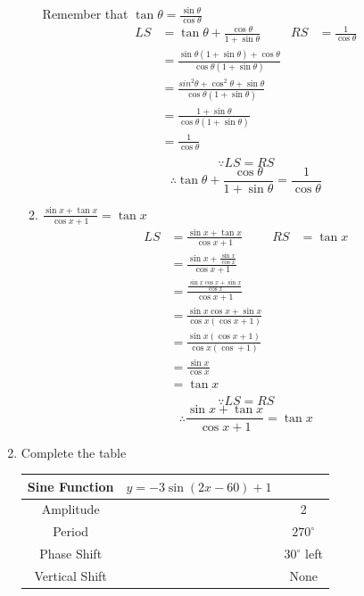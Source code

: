 \documentclass[paper=a4, fontsize=11pt]{scrartcl}
\begin{document}
\begin{enumerate}[resume]
\begin{enumerate}
        Remember that $\tan\theta=\frac{\sin\theta}{\cos\theta}$
        \begin{align*}
            LS&=\tan\theta+\frac{\cos\theta}{1+\sin\theta}&RS&=\frac{1}{\cos\theta}\\
            &=\frac{\sin\theta(1+\sin\theta)+\cos\theta}{\cos\theta(1+\sin\theta)}\\
            &=\frac{sin^2\theta+\cos^2\theta+\sin\theta}{\cos\theta(1+\sin\theta)}\\
            &=\frac{1+\sin\theta}{\cos\theta(1+\sin\theta)}\\
            &=\frac{1}{\cos\theta}\\
        \end{align*}
        $$\because LS=RS$$
        $$\therefore \tan\theta+\frac{\cos\theta}{1+\sin\theta}=\frac{1}{\cos\theta}$$
        \item $\frac{\sin x+\tan x}{\cos x+1}=\tan x$
        \begin{align*}
            LS&=\frac{\sin x+\tan x}{\cos x+1}&RS&=\tan x\\
            &=\frac{\sin x+\frac{\sin x}{\cos x}}{\cos x+1}\\
            &=\frac{\frac{\sin x\cos x+\sin x}{\cos x}}{\cos x+1}\\
            &=\frac{\sin x\cos x+\sin x}{\cos x(\cos x+1)}\\
            &=\frac{\sin x(\cos x+1)}{\cos x(\cos +1)}\\
            &=\frac{\sin x}{\cos x}\\
            &=\tan x\\
        \end{align*}
        $$\because LS=RS$$
        $$\therefore \frac{\sin x+\tan x}{\cos x+1}=\tan x$$
    \end{enumerate}
    \item Complete the table
    \begin{center}
        \begin{tabular}{|c|c|c|}
            \hline
            Sine Function&$y=-3\sin(2x-60)+1$&\\
            \hline
            Amplitude&&2\\
            \hline
            Period&&$270^\circ$\\
            \hline
            Phase Shift&&$30^\circ $ left\\
            \hline
            Vertical Shift&&None\\

\end{tabular}
\end{center}
\end{enumerate}
\end{document}
